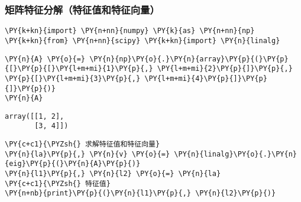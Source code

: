     \hypertarget{ux77e9ux9635ux7279ux5f81ux5206ux89e3ux7279ux5f81ux503cux548cux7279ux5f81ux5411ux91cf}{%
\subsubsection{矩阵特征分解（特征值和特征向量）}\label{ux77e9ux9635ux7279ux5f81ux5206ux89e3ux7279ux5f81ux503cux548cux7279ux5f81ux5411ux91cf}}

    \begin{tcolorbox}[breakable, size=fbox, boxrule=1pt, pad at break*=1mm,colback=cellbackground, colframe=cellborder]
\begin{Verbatim}[commandchars=\\\{\}]
\PY{k+kn}{import} \PY{n+nn}{numpy} \PY{k}{as} \PY{n+nn}{np}
\PY{k+kn}{from} \PY{n+nn}{scipy} \PY{k+kn}{import} \PY{n}{linalg}
\end{Verbatim}
\end{tcolorbox}

    \begin{tcolorbox}[breakable, size=fbox, boxrule=1pt, pad at break*=1mm,colback=cellbackground, colframe=cellborder]
\begin{Verbatim}[commandchars=\\\{\}]
\PY{n}{A} \PY{o}{=} \PY{n}{np}\PY{o}{.}\PY{n}{array}\PY{p}{(}\PY{p}{[}\PY{p}{[}\PY{l+m+mi}{1}\PY{p}{,} \PY{l+m+mi}{2}\PY{p}{]}\PY{p}{,} \PY{p}{[}\PY{l+m+mi}{3}\PY{p}{,} \PY{l+m+mi}{4}\PY{p}{]}\PY{p}{]}\PY{p}{)}
\PY{n}{A}
\end{Verbatim}
\end{tcolorbox}

            \begin{tcolorbox}[breakable, size=fbox, boxrule=.5pt, pad at break*=1mm, opacityfill=0]
\begin{Verbatim}[commandchars=\\\{\}]
array([[1, 2],
       [3, 4]])
\end{Verbatim}
\end{tcolorbox}
        
    \begin{tcolorbox}[breakable, size=fbox, boxrule=1pt, pad at break*=1mm,colback=cellbackground, colframe=cellborder]
\begin{Verbatim}[commandchars=\\\{\}]
\PY{c+c1}{\PYZsh{} 求解特征值和特征向量}
\PY{n}{la}\PY{p}{,} \PY{n}{v} \PY{o}{=} \PY{n}{linalg}\PY{o}{.}\PY{n}{eig}\PY{p}{(}\PY{n}{A}\PY{p}{)}
\PY{n}{l1}\PY{p}{,} \PY{n}{l2} \PY{o}{=} \PY{n}{la}
\PY{c+c1}{\PYZsh{} 特征值}
\PY{n+nb}{print}\PY{p}{(}\PY{n}{l1}\PY{p}{,} \PY{n}{l2}\PY{p}{)}
\end{Verbatim}
\end{tcolorbox}

